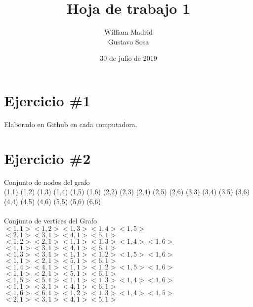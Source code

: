 \documentclass{article}
\title{Hoja de trabajo  1}
\author{William Madrid \\ Gustavo Sosa}
\date{30 de julio de 2019}
\begin{document}
\maketitle

\section*{Ejercicio \#1}
Elaborado en Github en cada computadora.


\section*{Ejercicio \#2}
Conjunto de nodos del grafo \\
(1,1) (1,2) (1,3) (1,4) (1,5) (1,6) (2,2) (2,3) (2,4) (2,5) (2,6) (3,3) (3,4) (3,5) (3,6) (4,4) (4,5) (4,6) (5,5) (5,6) (6,6)\\
\\
Conjunto de vertices del Grafo\\
\setlength{\parindent}{0cm}
$<1,1>$\hspace{1.7cm}$<1,2><1,3><1,4><1,5>$\hspace{0.5cm}$<2,1> <3,1> <4,1> <5,1>$\\
$<1,2><2,1>$\hspace{0.5cm}$<1,1><1,3><1,4><1,6>$\hspace{0.5cm}$<1,1> <3,1> <4,1> <6,1>$\\
$<1,3><3,1>$\hspace{0.5cm}$<1,1><1,2><1,5><1,6>$\hspace{0.5cm}$<1,1> <2,1> <5,1> <6,1>$\\
$<1,4><4,1>$\hspace{0.5cm}$<1,1><1,2><1,5><1,6>$\hspace{0.5cm}$<1,1> <2,1> <5,1> <6,1>$\\
$<1,5><5,1>$\hspace{0.5cm}$<1,1><1,3><1,4><1,6>$\hspace{0.5cm}$<1,1> <3,1> <4,1> <6,1>$\\
$<1,6><6,1>$\hspace{0.5cm}$<1,2><1,3><1,4><1,5>$\hspace{0.5cm}$<2,1> <3,1> <4,1> <5,1>$\\
\noindent
\end{document}
